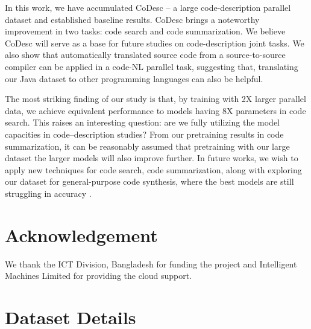 \documentclass[11pt,a4paper]{article}
\begin{document}
In this work, we have accumulated CoDesc -- a large code-description parallel dataset and established baseline results.
CoDesc brings a noteworthy improvement in two tasks: code search and code summarization. We believe CoDesc will serve as a base for future studies on code-description joint tasks.
We also show that automatically translated source code from a source-to-source compiler can be applied in a code-NL parallel task, suggesting that, translating our Java dataset to other programming languages can also be helpful.

The most striking finding of our study is that, by training with 2X larger parallel data, we achieve equivalent performance to models having 8X parameters \cite{codebert} in code search. This raises an interesting question: 
are we fully utilizing the model capacities in code--description studies?
From our pretraining results in code summarization, it can be reasonably assumed that pretraining with our large dataset the larger models will also improve further.
In future works, we wish to apply new techniques for code search, code summarization, along with exploring our dataset for general-purpose code synthesis, where the best models are still struggling in accuracy \cite{wei2019code,codegen2}.















 
\section*{Acknowledgement}
\label{sec:acknowledgement}
We thank the ICT Division, Bangladesh for funding the project and Intelligent Machines Limited for providing the cloud support. 



\clearpage
\appendix

\section{Dataset Details}
\end{document}
